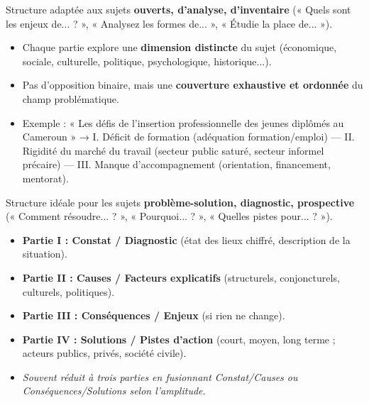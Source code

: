\documentclass[11pt]{article}
\begin{document}
\begin{definition}
Structure adaptée aux sujets \textbf{ouverts, d'analyse, d'inventaire} (« Quels sont les enjeux de... ? », « Analysez les formes de... », « Étudie la place de... »).
\begin{itemize}
\item Chaque partie explore une \textbf{dimension distincte} du sujet (économique, sociale, culturelle, politique, psychologique, historique...).
\item Pas d'opposition binaire, mais une \textbf{couverture exhaustive et ordonnée} du champ problématique.
\item Exemple : « Les défis de l'insertion professionnelle des jeunes diplômés au Cameroun » → I. Déficit de formation (adéquation formation/emploi) — II. Rigidité du marché du travail (secteur public saturé, secteur informel précaire) — III. Manque d'accompagnement (orientation, financement, mentorat).
\end{itemize}
\end{definition}

\begin{definition}
Structure idéale pour les sujets \textbf{problème-solution, diagnostic, prospective} (« Comment résoudre... ? », « Pourquoi... ? », « Quelles pistes pour... ? »).
\begin{itemize}
\item \textbf{Partie I : Constat / Diagnostic} (état des lieux chiffré, description de la situation).
\item \textbf{Partie II : Causes / Facteurs explicatifs} (structurels, conjoncturels, culturels, politiques).
\item \textbf{Partie III : Conséquences / Enjeux} (si rien ne change).
\item \textbf{Partie IV : Solutions / Pistes d'action} (court, moyen, long terme ; acteurs publics, privés, société civile).
\item \emph{Souvent réduit à trois parties en fusionnant Constat/Causes ou Conséquences/Solutions selon l'amplitude.}
\end{itemize}
\end{definition}
\end{document}
